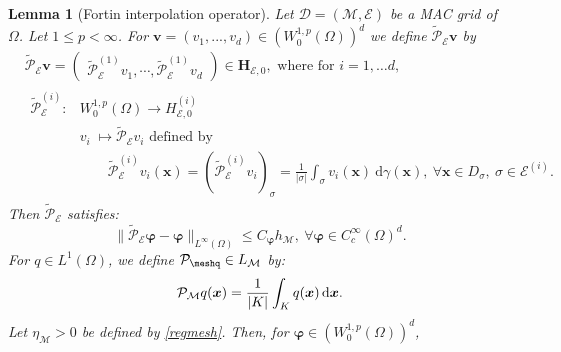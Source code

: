 \documentclass{amsart}
\newtheorem{lm}{Lemma}
\numberwithin{equation}{section}
\begin{document}
\begin{lm}[Fortin interpolation operator] \label{lem:fortin}
Let $\mathcal D= ({{\mathcal M}}, {{\mathcal E}})$ be a MAC grid of $\Omega$. Let $1 \le p <\infty$.
For ${{\boldsymbol v}}=(v_1,...,v_d) \in (W_{0}^{1,p}(\Omega))^{d}$ we define $\widetilde{\mathcal P}_{{\mathcal E}} {{\boldsymbol v}}$  by 
\begin{align}
  &\widetilde{\mathcal P}_{{\mathcal E}}{{\boldsymbol v}} =\begin{pmatrix}\widetilde{\mathcal P}_{{\mathcal E}}^{(1)} v_1, \cdots, \widetilde{\mathcal P}_{{\mathcal E}}^{(1)} v_d \end{pmatrix}\in  {{\mathbf{H}_{{{\mathcal E}},0}}}, 
  \mbox{ where for }i= 1, \ldots d, \nonumber\\
  & \begin{array}{ll}                                                                                         
    \widetilde{\mathcal P}_{{\mathcal E}}^{(i)}: & W_{0}^{1,p}(\Omega) \longrightarrow {H_{{{\mathcal E}},0}^{(i)}} \\
					 & {v_i}\;\longmapsto  \widetilde{\mathcal P}_{{\mathcal E}}{v_i} \mbox{ defined by}\\
			   & \qquad \displaystyle  \widetilde{\mathcal P}^{(i)}_{{\mathcal E}}{v_i}({{\boldsymbol x}})=(\widetilde{\mathcal P}^{(i)}_{{\mathcal E}}{v_i})_{{\sigma}}=\frac{1}{\vert{{\sigma}}\vert}\int_{{\sigma}} {v_i}({{\boldsymbol x}}) {\ \mathrm{d}\gamma({{\boldsymbol x}})}, \  \forall {{\boldsymbol x}}\in D_{{\sigma}}, \  {{\sigma}}\in{\mathcal {E}^{(i)}}.
\end{array} \label{interp-moyenne}
\end{align}
Then  $\widetilde{\mathcal P}_\operatorname{{\mathcal{E}}}$ satisfies:
\begin{equation}\label{strongcvfortin}
\|  \widetilde{\mathcal P}_\operatorname{{\mathcal{E}}} {{\boldsymbol \varphi}} - {{\boldsymbol \varphi}} \|_{L^\infty(\Omega)} \le C_{{\boldsymbol \varphi}} h_{{\mathcal M}}, \ \forall {{\boldsymbol \varphi}} \in C_c^\infty(\Omega)^d.
\end{equation}
For $q\in L^{1}(\Omega)$, we define $\mathcal{P}_\meshq  \in L_{{\mathcal M}}$ by:
\begin{equation}
    \mathcal{P}_{{\mathcal M}} q ({{\boldsymbol x}}) = \frac 1 {\vert K \vert} \int_K q ({{\boldsymbol x}}) {\, {\rm d}{{\boldsymbol x}}}. \label{Pmesh}
\end{equation}
Let $\eta_{{\mathcal M}} >0$ be defined by \eqref{regmesh}.
Then, for ${{\boldsymbol \varphi}}\in (W_{0}^{1,p}(\Omega))^{d}$, 

\end{lm}
\end{document}
